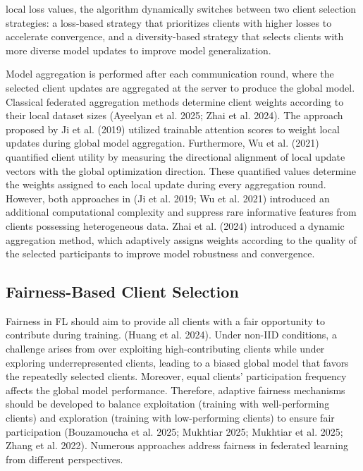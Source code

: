\documentclass[pdflatex,sn-mathphys-num,oneside]{sn-jnl}%
\theoremstyle{thmstyleone}%
\theoremstyle{thmstyletwo}%
\theoremstyle{thmstylethree}%
\begin{document}
local loss values, the algorithm dynamically switches between two client selection strategies: a loss-based strategy that prioritizes clients with higher losses to accelerate convergence, and a diversity-based strategy that selects clients with more diverse model updates to improve model generalization.

Model aggregation is performed after each communication round, where the selected client updates are aggregated at the server to produce the global model. Classical federated aggregation methods determine client weights according to their local dataset sizes (Ayeelyan et al. 2025; Zhai et al. 2024). The approach proposed by Ji et al. (2019) utilized trainable attention scores to weight local updates during global model aggregation. Furthermore, Wu et al. (2021) quantified client utility by measuring the directional alignment of local update vectors with the global optimization direction. These quantified values determine the weights assigned to each local update during every aggregation round. However, both approaches in (Ji et al. 2019; Wu et al. 2021) introduced an additional computational complexity and suppress rare informative features from clients possessing heterogeneous data. Zhai et al. (2024) introduced a dynamic aggregation method, which adaptively assigns weights according to the quality of the selected participants to improve model robustness and convergence.  


\subsection{Fairness-Based Client Selection}

Fairness in FL should aim to provide all clients with a fair opportunity to contribute during training. (Huang et al. 2024). Under non-IID conditions, a challenge arises from over exploiting high-contributing clients while under exploring underrepresented clients, leading to a biased global model that favors the repeatedly selected clients. Moreover, equal clients’ participation frequency affects the global model performance. Therefore, adaptive fairness mechanisms should be developed to balance exploitation (training with well-performing clients) and exploration (training with low-performing clients) to ensure fair participation (Bouzamoucha et al. 2025; Mukhtiar 2025; Mukhtiar et al. 2025; Zhang et al. 2022). Numerous approaches address fairness in federated learning from different perspectives.  
\end{document}
